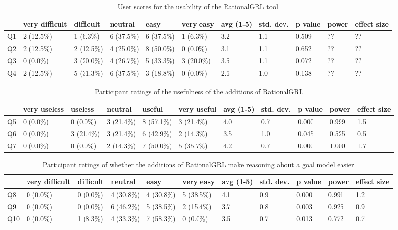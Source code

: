 \begin{table*}[t]
\centering
\begin{tabularx}{0.95\textwidth}{l|l|l|l|l|l||l|l|l|l|l}
& very difficult & difficult & neutral & easy & very easy & avg (1-5) & std. dev. & p value & power & effect size\\
\hline
Q1 & 2 (12.5\%) & 1 (6.3\%)  & 6 (37.5\%) & 6 (37.5\%) & 1 (6.3\%)  & 3.2 & 1.1 & 0.509 & ?? & ??\\
Q2 & 2 (12.5\%) & 2 (12.5\%) & 4 (25.0\%) & 8 (50.0\%) & 0 (0.0\%)  & 3.1 & 1.1 & 0.652 & ?? & ??\\
Q3 & 0 (0.0\%)  & 3 (20.0\%) & 4 (26.7\%) & 5 (33.3\%) & 3 (20.0\%) & 3.5 & 1.1 & 0.072 & ?? & ??\\
Q4 & 2 (12.5\%) & 5 (31.3\%) & 6 (37.5\%) & 3 (18.8\%) & 0 (0.0\%)  & 2.6 & 1.0 & 0.138 & ?? & ??
\end{tabularx}
\caption{User scores for the usability of the RationalGRL tool}
\label{table:survey:table1}
\end{table*}

\begin{table*}[t]
\centering
\begin{tabularx}{0.95\textwidth}{l|l|l|l|l|l||l|l|l|l|l}
& very useless & useless & neutral & useful & very useful & avg (1-5) & std. dev. & p value & power & effect size\\
\hline
Q5 & 0 (0.0\%) & 0 (0.0\%)  & 3 (21.4\%) & 8 (57.1\%) & 3 (21.4\%) & 4.0 & 0.7 & 0.000 & 0.999 & 1.5 \\
Q6 & 0 (0.0\%) & 3 (21.4\%) & 3 (21.4\%) & 6 (42.9\%) & 2 (14.3\%) & 3.5 & 1.0 & 0.045 & 0.525 & 0.5\\
Q7 & 0 (0.0\%) & 0 (0.0\%)  & 2 (14.3\%) & 7 (50.0\%) & 5 (35.7\%) & 4.2 & 0.7 & 0.000 & 1.000 & 1.7
\end{tabularx}
\caption{Participant ratings of the usefulness of the additions of RationalGRL}
\label{table:survey:table2}
\end{table*}

\begin{table*}[t]
\centering
\begin{tabularx}{0.95\textwidth}{l|l|l|l|l|l||l|l|l|l|l}
& very difficult & difficult & neutral & easy & very easy & avg (1-5) & std. dev. & p value & power & effect size\\
\hline
Q8  & 0 (0.0\%) & 0 (0.0\%) & 4 (30.8\%) & 4 (30.8\%) & 5 (38.5\%) & 4.1 & 0.9 & 0.000 & 0.991 & 1.2\\
Q9  & 0 (0.0\%) & 0 (0.0\%) & 6 (46.2\%) & 5 (38.5\%) & 2 (15.4\%) & 3.7 & 0.8 & 0.003 & 0.925 & 0.9\\
Q10 & 0 (0.0\%) & 1 (8.3\%) & 4 (33.3\%) & 7 (58.3\%) & 0 (0.0\%)  & 3.5 & 0.7 & 0.013 & 0.772 & 0.7
\end{tabularx}
\caption{Participant ratings of whether the additions of RationalGRL make reasoning about a goal model easier}
\label{table:survey:table3}
\end{table*}

